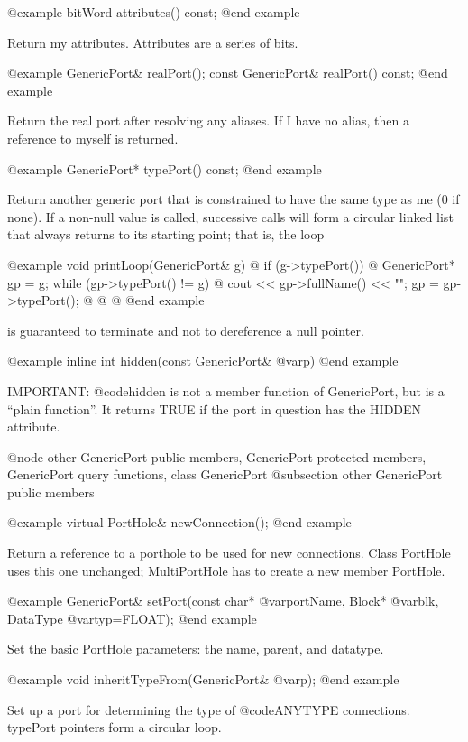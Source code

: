 @example
bitWord attributes() const;
@end example

Return my attributes.  Attributes are a series of bits.

@example
GenericPort& realPort();
const GenericPort& realPort() const;
@end example

Return the real port after resolving any aliases.  If I have no alias,
then a reference to myself is returned.

@example
GenericPort* typePort() const;
@end example

Return another generic port that is constrained to have the same type as
me (0 if none).  If a non-null value is called, successive calls will
form a circular linked list that always returns to its starting point;
that is, the loop

@example
void printLoop(GenericPort& g) @{
        if (g->typePort()) @{
                GenericPort* gp = g;
                while (gp->typePort() != g) @{
                        cout << gp->fullName() << "\n";
                        gp = gp->typePort();
                @}
        @}
@}
@end example

is guaranteed to terminate and not to dereference a null pointer.

@example
inline int hidden(const GenericPort& @var{p})
@end example

IMPORTANT: @code{hidden} is not a member function of GenericPort,
but is a ``plain function''.  It returns TRUE if the port in question
has the HIDDEN attribute.

@node other GenericPort public members, GenericPort protected members, GenericPort query functions, class GenericPort
@subsection other GenericPort public members

@example
virtual PortHole& newConnection();
@end example

Return a reference to a porthole to be used for new connections.
Class PortHole uses this one unchanged; MultiPortHole has to create
a new member PortHole.

@example
GenericPort& setPort(const char* @var{portName}, Block* @var{blk}, DataType @var{typ}=FLOAT);
@end example

Set the basic PortHole parameters: the name, parent, and datatype.

@example
void inheritTypeFrom(GenericPort& @var{p});
@end example

Set up a port for determining the type of @code{ANYTYPE} connections.
typePort pointers form a circular loop.

